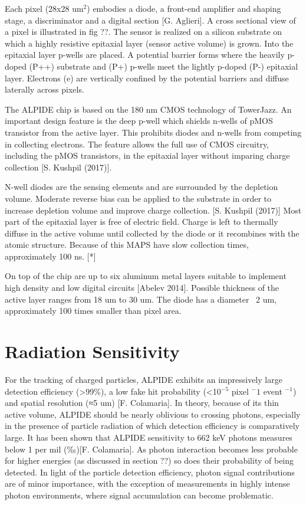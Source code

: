 Each pixel (28x28 um$^2$) embodies a diode, a front-end amplifier and shaping stage, a discriminator and a digital section [G. Aglieri]. A cross sectional view of a pixel is illustrated in fig ??. The sensor is realized on a silicon substrate on which a highly resistive epitaxial layer (sensor active volume) is grown. Into the epitaxial layer p-wells are placed. A potential barrier forms where the heavily p-doped (P++) substrate and (P+) p-wells meet the lightly p-doped (P-) epitaxial layer. Electrons (e) are vertically confined by the potential barriers and diffuse laterally across pixels.

The ALPIDE chip is based on the 180 nm CMOS technology of TowerJazz. An important design feature is the deep p-well which shields n-wells of pMOS transistor from the active layer. This prohibits diodes and n-wells from competing in collecting electrons. The feature allows the full use of CMOS circuitry, including the pMOS transistors, in the epitaxial layer without imparing charge collection [S. Kushpil (2017)].

N-well diodes are the sensing elements and are surrounded by the depletion volume. Moderate reverse bias can be applied to the substrate in order to increase depletion volume and improve charge collection. [S. Kushpil (2017)]
Most part of the epitaxial layer is free of electric field. Charge is left to thermally diffuse in the active volume until collected by the diode or it recombines with the atomic structure. Because of this MAPS have slow collection times, approximately 100 ns. [*]

On top of the chip are up to six aluminum metal layers suitable to implement high density and low digital circuits [Abelev 2014]. Possible thickness of the active layer ranges from 18 um to 30 um. The diode has a diameter ~2 um, approximately 100 times smaller than pixel area.


\section{Radiation Sensitivity}
For the tracking of charged particles, ALPIDE exhibits an impressively large detection efficiency (>99\%), a low fake hit probability (<10$^{-5}$ pixel $^-1$ event $^{-1}$) and spatial resolution (≈5 um) [F. Colamaria].
In theory, because of its thin active volume, ALPIDE should be nearly oblivious to crossing photons, especially in the presence of particle radiation of which detection efficiency is comparatively large. It has been shown that ALPIDE sensitivity to 662 keV photons measures below 1 per mil (‰)[F. Colamaria]. As photon interaction becomes less probable for higher energies (as discussed in section ??) so does their probability of being detected. In light of the particle detection efficiency, photon signal contributions are of minor importance, with the exception of measurements in highly intense photon environments, where signal accumulation can become problematic.
